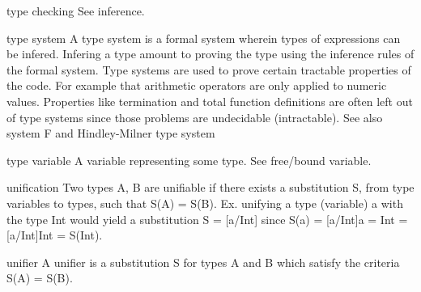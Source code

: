 type checking
See inference.

type system
A type system is a formal system wherein types of expressions can be infered. Infering a type amount to proving the type using the inference rules of the formal system.
Type systems are used to prove certain tractable properties of the code. For example that arithmetic operators are only applied to numeric values. Properties like termination and total function definitions are often left out of type systems since those problems are undecidable (intractable).
See also system F and Hindley-Milner type system

type variable
A variable representing some type. See free/bound variable.

unification
Two types A, B are unifiable if there exists a substitution S, from type variables to types, such that S(A) = S(B).
Ex. unifying a type (variable) a with the type Int would yield a substitution S = [a/Int] since S(a) = [a/Int]a = Int = [a/Int]Int = S(Int).

unifier
A unifier is a substitution S for types A and B which satisfy the criteria S(A) = S(B).
